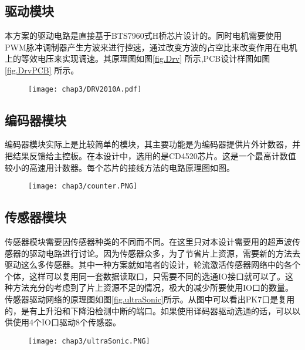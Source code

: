 \subsection{驱动模块}
本方案的驱动电路是直接基于BTS7960式H桥芯片设计的。同时电机需要使用PWM脉冲调制器产生方波来进行控速，通过改变方波的占空比来改变作用在电机上的等效电压来实现调速。其原理图如图\ref{fig.Drv} 所示,PCB设计样图如图\ref{fig.DrvPCB} 所示。
\begin{figure}[!htp]
  \centering
  \texttt{[image: chap3/DRV2010A.pdf]}
\end{figure}
\begin{figure}
  \centering
  \hspace{1in}
\end{figure}

\subsection{编码器模块}
编码器模块实际上是比较简单的模块，其主要功能是为编码器提供片外计数器，并把结果反馈给主控板。在本设计中，选用的是CD4520芯片。这是一个最高计数值较小的高速用计数器。每个芯片的接线方法的电路原理图如图。\\
\begin{figure}[!htp]
  \centering
  \texttt{[image: chap3/counter.PNG]}
\end{figure}
\subsection{传感器模块}
传感器模块需要因传感器种类的不同而不同。在这里只对本设计需要用的超声波传感器的驱动电路进行讨论。因为传感器众多，为了节省片上资源，需要新的方法去驱动这么多传感器。其中一种方案就如笔者的设计，轮流激活传感器网络中的各个个体，这样可以复用同一套数据读取口，只需要不同的选通IO接口就可以了。这种方法充分的考虑到了片上资源不足的情况，极大的减少所要使用IO口的数量。传感器驱动网络的原理图如图\ref{fig.ultraSonic}所示。从图中可以看出PK7口是复用的，是有上升沿和下降沿检测中断的端口。如果使用译码器驱动选通的话，可以以供使用4个IO口驱动8个传感器。
\begin{figure}[!htp]
  \centering
  \texttt{[image: chap3/ultraSonic.PNG]}
\end{figure}


